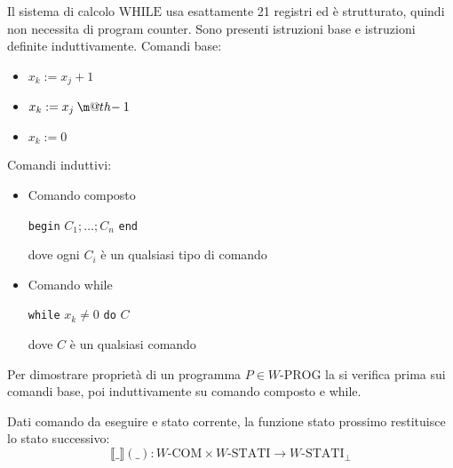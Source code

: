 \documentclass[12pt, answers]{exam}
\makeatletter
\theoremstyle{plain}
\newcommand{\while}{\text{WHILE}}
\newcommand{\wstati}{W\text{-STATI}}
\newcommand{\wcom}{W\text{-COM}}
\newcommand{\wprog}{W\text{-PROG}}
\newcommand{\dotminus}{\mathbin{\text{\@dotminus}}}
\newcommand{\@dotminus}{%
    \ooalign{\hidewidth\raise1ex\hbox{.}\hidewidth\cr$\m@th-$\cr}%
}
\makeatother
\begin{document}
\begin{questions}
        \begin{solution}
            Il sistema di calcolo $\while$ usa esattamente 21 registri ed è strutturato, quindi non necessita di program counter. Sono presenti istruzioni base e istruzioni definite induttivamente. Comandi base: 
            \begin{itemize}
                \item $x_k := x_j + 1$
                
                \item $x_k := x_j \dotminus 1$
                
                \item $x_k := 0$
            \end{itemize}
            
            Comandi induttivi: 
            \begin{itemize}
                \item Comando composto
                \begin{center}
                    \texttt{begin} $C_1; \dots; C_n$ \texttt{end}
                \end{center}
                dove ogni $C_i$ è un qualsiasi tipo di comando
                
                \item Comando while
                \begin{center}
                    \texttt{while} $x_k \neq 0$ \texttt{do} $C$
                \end{center}
                dove $C$ è un qualsiasi comando
            \end{itemize}
            
            Per dimostrare proprietà di un programma $P \in \wprog$ la si verifica prima sui comandi base, poi induttivamente su comando composto e while.
            
            Dati comando da eseguire e stato corrente, la funzione stato prossimo restituisce lo stato successivo: 
            $$  \llbracket \_ \rrbracket ( \_ ): \wcom \times \wstati \rightarrow \wstati_\bot $$
            

\end{solution}
\end{questions}
\end{document}
